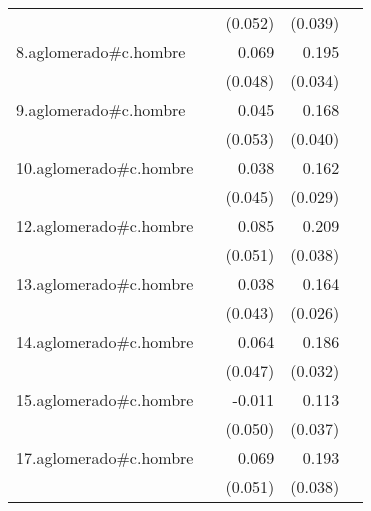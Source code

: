 {\begin{longtable}{l*{4}{D{.}{.}{-1}}}
            &                     &     (0.052)         &     (0.039)         &                     \\
\addlinespace
8.aglomerado#c.hombre&                     &       0.069         &       0.195\sym{***}&                     \\
            &                     &     (0.048)         &     (0.034)         &                     \\
\addlinespace
9.aglomerado#c.hombre&                     &       0.045         &       0.168\sym{***}&                     \\
            &                     &     (0.053)         &     (0.040)         &                     \\
\addlinespace
10.aglomerado#c.hombre&                     &       0.038         &       0.162\sym{***}&                     \\
            &                     &     (0.045)         &     (0.029)         &                     \\
\addlinespace
12.aglomerado#c.hombre&                     &       0.085         &       0.209\sym{***}&                     \\
            &                     &     (0.051)         &     (0.038)         &                     \\
\addlinespace
13.aglomerado#c.hombre&                     &       0.038         &       0.164\sym{***}&                     \\
            &                     &     (0.043)         &     (0.026)         &                     \\
\addlinespace
14.aglomerado#c.hombre&                     &       0.064         &       0.186\sym{***}&                     \\
            &                     &     (0.047)         &     (0.032)         &                     \\
\addlinespace
15.aglomerado#c.hombre&                     &      -0.011         &       0.113\sym{**} &                     \\
            &                     &     (0.050)         &     (0.037)         &                     \\
\addlinespace
17.aglomerado#c.hombre&                     &       0.069         &       0.193\sym{***}&                     \\
            &                     &     (0.051)         &     (0.038)         &                     \\

\end{longtable}}
